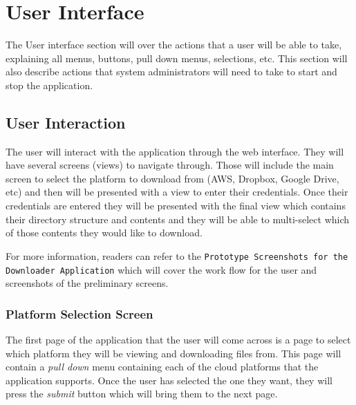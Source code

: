 \documentclass{article}
\begin{document}












\section{User Interface}
The User interface section will over the actions that a user will be able to take, explaining all menus, buttons,
pull down menus, selections, etc. This section will also describe actions that system administrators will need to
take to start and stop the application.

    \subsection{User Interaction}
    The user will interact with the application through the web interface. They will have several screens (views)
    to navigate through. Those will include the main screen to select the platform to download from (AWS, Dropbox,
    Google Drive, etc) and then will be presented with a view to enter their credentials. Once their credentials
    are entered they will be presented with the final view which contains their directory structure and contents
    and they will be able to multi-select which of those contents they would like to download.

    For more information, readers can refer to the \texttt{Prototype Screenshots for the Downloader Application}\cite{prot}
    which will cover the work flow for the user and screenshots of the preliminary screens.
    
      \subsubsection{Platform Selection Screen}
      The first page of the application that the user will come across is a page to select which platform they will be
      viewing and downloading files from. This page will contain a \textit{pull down} menu containing each of the
      cloud platforms that the application supports. Once the user has selected the one they want, they will press the
      \textit{submit} button which will bring them to the next page.
\end{document}
